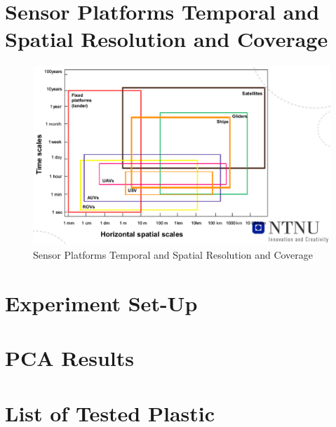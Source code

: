 \begin{appendices}

\chapter{Sensor Platforms Temporal and Spatial Resolution and Coverage}
\label{app:platform}

\begin{figure}
    \centering
    \includegraphics{Images/appendix/platforms.png}
    \caption{Sensor Platforms Temporal and Spatial Resolution and Coverage}
    \label{fig:platforms}
\end{figure}

\chapter{Experiment Set-Up}
\label{app:method}


\chapter{PCA Results}
\label{app:PCA_res_full}

\chapter{List of Tested Plastic}
\label{app:list_plast}





\end{appendices}
